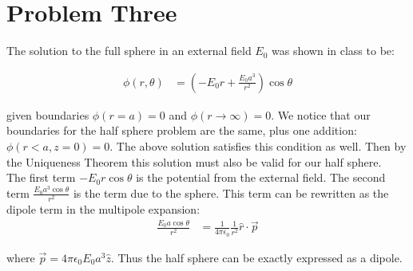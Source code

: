 \documentclass[10pt]{article} %
\begin{document}
\section{Problem Three}
The solution to the full sphere in an external field $E_0$ was shown in class to be:

\begin{align*}
  \phi(r,\theta) &= \left(-E_0r + \frac{E_0a^3}{r^2}\right)\cos\theta
\end{align*}

given boundaries $\phi(r=a) = 0$ and $\phi(r\rightarrow\infty) = 0$. We notice that our boundaries for the half sphere problem are the same, plus one addition: $\phi(r<a, z=0) = 0$. The above solution satisfies this condition as well. Then by the Uniqueness Theorem this solution must also be valid for our half sphere.\\

The first term $-E_0r\cos\theta$ is the potential from the external field. The second term $\frac{E_0a^3\cos\theta}{r^2}$ is the term due
to the sphere. This term can be rewritten as the dipole term in the multipole expansion:
\begin{align*}
  \frac{E_0a\cos\theta}{r^2} &= \frac{1}{4\pi\epsilon_0}\frac{1}{r^2} \hat{r} \cdot \vec{p}
\end{align*}

where $\vec{p} = 4\pi\epsilon_0E_0 a^3 \hat{z}$. Thus the half sphere can be exactly expressed as a dipole.\\
\end{document}
